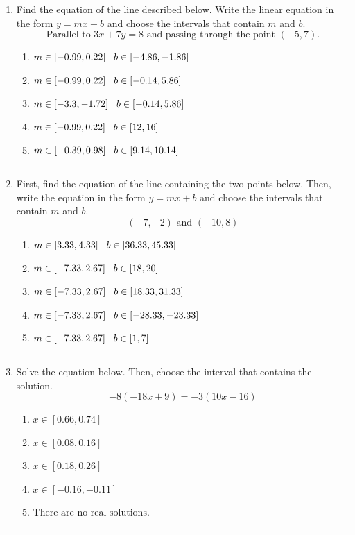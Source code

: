 \documentclass[14pt]{extbook}
\newcommand{\litem}[1]{\item#1\hspace*{-1cm}\rule{\textwidth}{0.4pt}}
\begin{document}
\begin{enumerate}
{\begin{enumerate}[label=\Alph*.]
\end{enumerate} }
\litem{
Find the equation of the line described below. Write the linear equation in the form $ y=mx+b $ and choose the intervals that contain $m$ and $b$.\[ \text{Parallel to } 3 x + 7 y = 8 \text{ and passing through the point } (-5, 7). \]\begin{enumerate}[label=\Alph*.]
\item \( m \in [-0.99, 0.22] \hspace*{3mm} b \in [-4.86, -1.86] \)
\item \( m \in [-0.99, 0.22] \hspace*{3mm} b \in [-0.14, 5.86] \)
\item \( m \in [-3.3, -1.72] \hspace*{3mm} b \in [-0.14, 5.86] \)
\item \( m \in [-0.99, 0.22] \hspace*{3mm} b \in [12, 16] \)
\item \( m \in [-0.39, 0.98] \hspace*{3mm} b \in [9.14, 10.14] \)

\end{enumerate} }
\litem{
First, find the equation of the line containing the two points below. Then, write the equation in the form $ y=mx+b $ and choose the intervals that contain $m$ and $b$.\[ (-7, -2) \text{ and } (-10, 8) \]\begin{enumerate}[label=\Alph*.]
\item \( m \in [3.33, 4.33] \hspace*{3mm} b \in [36.33, 45.33] \)
\item \( m \in [-7.33, 2.67] \hspace*{3mm} b \in [18, 20] \)
\item \( m \in [-7.33, 2.67] \hspace*{3mm} b \in [18.33, 31.33] \)
\item \( m \in [-7.33, 2.67] \hspace*{3mm} b \in [-28.33, -23.33] \)
\item \( m \in [-7.33, 2.67] \hspace*{3mm} b \in [1, 7] \)

\end{enumerate} }
\litem{
Solve the equation below. Then, choose the interval that contains the solution.\[ -8(-18x + 9) = -3(10x -16) \]\begin{enumerate}[label=\Alph*.]
\item \( x \in [0.66, 0.74] \)
\item \( x \in [0.08, 0.16] \)
\item \( x \in [0.18, 0.26] \)
\item \( x \in [-0.16, -0.11] \)
\item \( \text{There are no real solutions.} \)


\end{enumerate}}
\end{enumerate}
\end{document}
